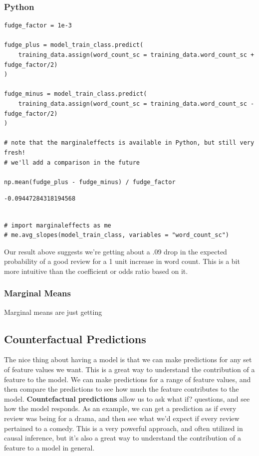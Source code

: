 \documentclass[
  letterpaper,
]{krantz}
\begin{document}
\subsubsection{Python}

\begin{verbatim}
fudge_factor = 1e-3

fudge_plus = model_train_class.predict(
    training_data.assign(word_count_sc = training_data.word_count_sc + fudge_factor/2)
)

fudge_minus = model_train_class.predict(
    training_data.assign(word_count_sc = training_data.word_count_sc - fudge_factor/2)
)

# note that the marginaleffects is available in Python, but still very fresh!
# we'll add a comparison in the future

np.mean(fudge_plus - fudge_minus) / fudge_factor
\end{verbatim}

\begin{verbatim}
-0.09447284318194568
\end{verbatim}

\begin{verbatim}

# import marginaleffects as me
# me.avg_slopes(model_train_class, variables = "word_count_sc")
\end{verbatim}

Our result above suggests we're getting about a .09 drop in the expected
probability of a good review for a 1 unit increase in word count. This
is a bit more intuitive than the coefficient or odds ratio based on it.

\subsubsection{Marginal Means}\label{marginal-means}

Marginal means are just getting

\subsection{Counterfactual
Predictions}\label{counterfactual-predictions}

The nice thing about having a model is that we can make predictions for
any set of feature values we want. This is a great way to understand the
contribution of a feature to the model. We can make predictions for a
range of feature values, and then compare the predictions to see how
much the feature contributes to the model. \textbf{Countefactual
predictions} allow us to ask what if? questions, and see how the model
responds. As an example, we can get a prediction as if every review was
being for a drama, and then see what we'd expect if every review
pertained to a comedy. This is a very powerful approach, and often
utilized in causal inference, but it's also a great way to understand
the contribution of a feature to a model in general.
\end{document}
